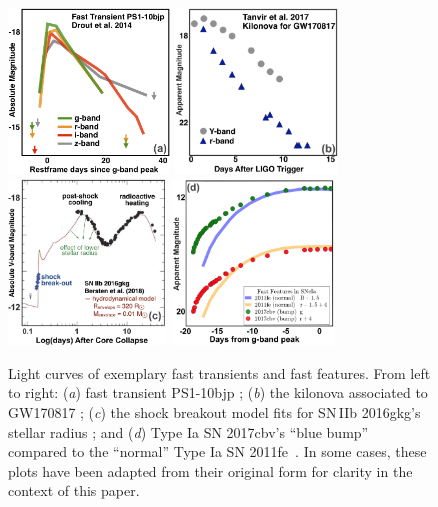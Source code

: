 \documentclass[letterpaper,longauthor,trackchanges,twocolumn,onecolappendix,sort&compress]{aastex62}
\begin{document}
\begin{center}
\begin{figure}[!t]
\includegraphics[height=4.4cm]{figures/fasttrans2.png}
\includegraphics[height=4.4cm]{figures/Tanvir_fig2_remake_small.png}
\includegraphics[height=4.4cm]{figures/2016gkg2_small.png}
\includegraphics[height=4.4cm]{figures/bluebump2.png}
\caption{{Light curves of  exemplary fast transients and fast features. From left to right: (\emph{a}) fast transient PS1-10bjp \citep{Drout2014}; (\emph{b}) the kilonova associated to GW170817 \citep{Tanvir2017}; (\emph{c}) the shock breakout model fits for SN\,IIb 2016gkg's stellar radius \citep{Bersten2018}; and (\emph{d})  Type Ia SN 2017cbv's ``blue bump'' compared to the ``normal'' Type Ia SN 2011fe~\citep{Hosseinzadeh2017,Graham2015}.} In some cases, these plots have been adapted from their original form for clarity in the context of this paper.}\label{fig:examples}
\end{figure}
\end{center}
\end{document}
